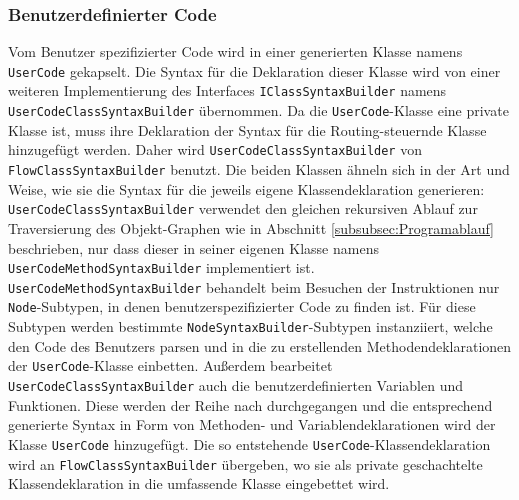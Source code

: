 \subsubsection{Benutzerdefinierter Code}
Vom Benutzer spezifizierter Code wird in einer generierten Klasse namens \texttt{UserCode} gekapselt. Die Syntax für die Deklaration dieser Klasse wird von einer weiteren Implementierung des Interfaces \texttt{IClassSyntaxBuilder} namens \texttt{User\-Code\-Class\-Syn\-tax\-Buil\-der} übernommen. Da die \texttt{UserCode}-Klasse eine private Klasse ist, muss ihre Deklaration der Syntax für die Routing-steuernde Klasse hinzugefügt werden. Daher wird \texttt{UserCodeClassSyntaxBuilder} von \texttt{FlowClassSyntaxBuilder} benutzt. Die beiden Klassen ähneln sich in der Art und Weise, wie sie die Syntax für die jeweils eigene Klassendeklaration generieren: \texttt{UserCodeClassSyntaxBuilder} verwendet den gleichen rekursiven Ablauf zur Traversierung des Objekt-Graphen wie in Abschnitt \ref{subsubsec:Programablauf} beschrieben, nur dass dieser in seiner eigenen Klasse namens \texttt{UserCodeMethodSyntaxBuilder} implementiert ist. \texttt{User\-Code\-Meth\-od\-Syn\-tax\-Buil\-der} behandelt beim Besuchen der Instruktionen nur \texttt{Node}-Subtypen, in denen benutzerspezifizierter Code zu finden ist. Für diese Subtypen werden bestimmte \texttt{NodeSyntaxBuilder}-Subtypen instanziiert, welche den Code des Benutzers parsen und in die zu erstellenden Methodendeklarationen der \texttt{UserCode}-Klasse einbetten. Außerdem bearbeitet \texttt{UserCodeClassSyntaxBuilder} auch die benutzerdefinierten Variablen und Funktionen. Diese werden der Reihe nach durchgegangen und die entsprechend generierte Syntax in Form von Methoden- und Variablendeklarationen wird der Klasse \texttt{UserCode} hinzugefügt. Die so entstehende \texttt{UserCode}-Klassendeklaration wird an \texttt{FlowClassSyntaxBuilder} übergeben, wo sie als private geschachtelte Klassendeklaration in die umfassende Klasse eingebettet wird.

\newpage

